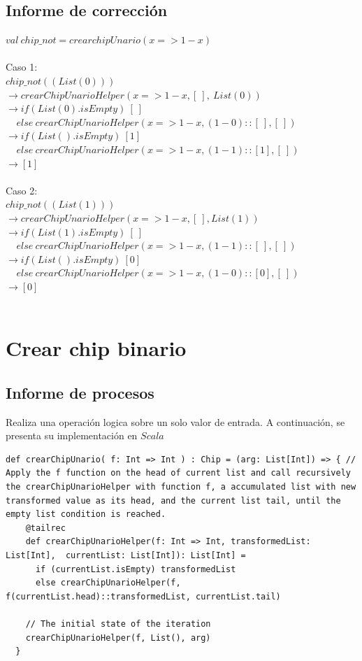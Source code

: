 \documentclass[12pt, a4paper]{article}
\begin{document}
\subsection{Informe de corrección}
$val~chip\_not = crearchipUnario(x => 1- x)$ \\ \\
Caso 1: \\ 
$chip\_not((List(0)))$ \\
$\rightarrow crearChipUnarioHelper(x => 1 - x, [~], ~List(0))$ \\
$\rightarrow if (List(0).isEmpty)~[~] $ \\
$~~~~~else~crearChipUnarioHelper(x => 1 - x, (1 - 0)::[~], [~])$ \\
$\rightarrow if (List().isEmpty)~[1] $ \\
$~~~~~else~crearChipUnarioHelper(x => 1 - x, (1 - 1)::[1], [~])$ \\
$\rightarrow [1]$ \\ \\
Caso 2: \\ 
$chip\_not((List(1)))$ \\
$\rightarrow crearChipUnarioHelper(x => 1- x, [~], List(1))$ \\
$\rightarrow if (List(1).isEmpty)~[~] $ \\
$~~~~~else~crearChipUnarioHelper(x => 1 - x, (1 - 1)::[~], [~])$ \\
$\rightarrow if (List().isEmpty)~[0] $ \\
$~~~~~else~crearChipUnarioHelper(x => 1 - x, (1 - 0)::[0], [~])$ \\
$\rightarrow [0]$ \\ \\


\section{Crear chip binario}
\subsection{Informe de procesos}
Realiza una operación logica sobre un solo valor de entrada. A continuación, se presenta su implementación en $Scala$ \\[16pt]
\begin{lstlisting}[style=scalaStyle, caption=Aplica una operación binaria sobre una valor de entrada.]
  def crearChipUnario( f: Int => Int ) : Chip = (arg: List[Int]) => { // Apply the f function on the head of current list and call recursively the crearChipUnarioHelper with function f, a accumulated list with new transformed value as its head, and the current list tail, until the empty list condition is reached.
    @tailrec
    def crearChipUnarioHelper(f: Int => Int, transformedList: List[Int],  currentList: List[Int]): List[Int] =
      if (currentList.isEmpty) transformedList
      else crearChipUnarioHelper(f, f(currentList.head)::transformedList, currentList.tail)

    // The initial state of the iteration
    crearChipUnarioHelper(f, List(), arg)
  }
\end{lstlisting}
\end{document}
